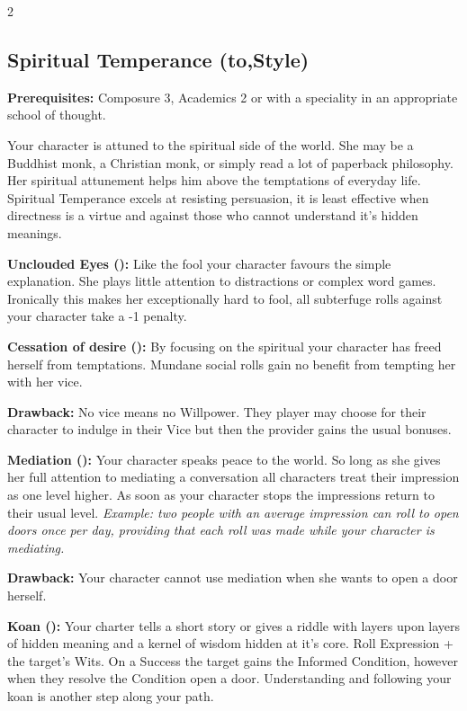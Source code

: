 \begin{multicols}{2}
\subsection*{Spiritual Temperance (\textbullet\nobreak\hspace{.16667em}to\nobreak\hspace{.16667em}\textbullet\textbullet\textbullet\textbullet\textbullet,\nobreak\hspace{.16667em}Style)}

\textbf{Prerequisites:} Composure 3, Academics 2 or with a speciality in an appropriate school of thought.

Your character is attuned to the spiritual side of the world. She may be a Buddhist monk, a Christian monk, or simply read a lot of paperback philosophy. Her spiritual attunement helps him above the temptations of everyday life. Spiritual Temperance excels at resisting persuasion, it is least effective when directness is a virtue and against those who cannot understand it's hidden meanings.


\textbf{Unclouded Eyes (\textbullet):} Like the fool your character favours the simple explanation. She plays little attention to distractions or complex word games. Ironically this makes her exceptionally hard to fool, all subterfuge rolls against your character take a -1 penalty.

\textbf{Cessation of desire (\textbullet\textbullet):} By focusing on the spiritual your character has freed herself from temptations. Mundane social rolls gain no benefit from tempting her with her vice.

\textbf{Drawback:} No vice means no Willpower. They player may choose for their character to indulge in their Vice but then the provider gains the usual bonuses. 

\textbf{Mediation (\textbullet\textbullet\textbullet):} Your character speaks peace to the world. So long as she gives her full attention to mediating a conversation all characters treat their impression as one level higher. As soon as your character stops the impressions return to their usual level. \textit{Example: two people with an average impression can roll to open doors once per day, providing that each roll was made while your character is mediating.}

\textbf{Drawback:} Your character cannot use mediation when she wants to open a door herself.

\textbf{Koan (\textbullet\textbullet\textbullet\textbullet):} Your charter tells a short story or gives a riddle with layers upon layers of hidden meaning and a kernel of wisdom hidden at it's core. Roll Expression + the target's Wits. On a Success the target gains the Informed Condition, however when they resolve the Condition open a door. Understanding and following your koan is another step along your path.


\end{multicols}
